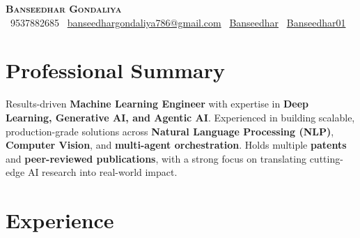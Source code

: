 \documentclass[a4paper,11pt]{article}
\begin{document}
\begin{center}
    {{\fontsize{26}{28}\selectfont \scshape \textbf{Banseedhar Gondaliya}}} \\ \vspace{3pt}
    \small
    \faPhone~9537882685 \hspace{1em}
    \faEnvelope~\href{mailto:banseedhargondaliya786@gmail.com}{banseedhargondaliya786@gmail.com} \hspace{1em}
    \faLinkedin~\href{https://www.linkedin.com/in/banseedhar-g-b84472193/}{Banseedhar} \hspace{1em}
    \faGithub~\href{https://github.com/Banseedhar01}{Banseedhar01}
\end{center}

\vspace{2pt}
\section*{Professional Summary}
Results-driven \textbf{Machine Learning Engineer} with expertise in \textbf{Deep Learning, Generative AI, and Agentic AI}.
Experienced in building scalable, production-grade solutions across \textbf{Natural Language Processing (NLP)}, \textbf{Computer Vision}, and
\textbf{multi-agent orchestration}. Holds multiple \textbf{patents} and \textbf{peer-reviewed publications}, with a strong focus on translating
cutting-edge AI research into real-world impact.


\vspace{3pt}
\section{Experience}
\end{document}
